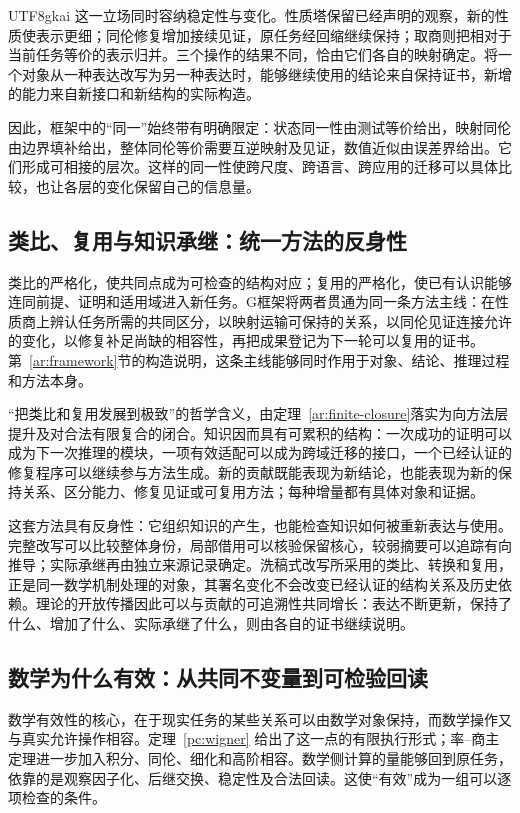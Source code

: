 \documentclass[11pt,a4paper]{article}
\theoremstyle{plain}
\theoremstyle{definition}
\theoremstyle{remark}
\begin{document}
\begin{CJK*}{UTF8}{gkai}
这一立场同时容纳稳定性与变化。性质塔保留已经声明的观察，新的性质使表示更细；同伦修复增加接续见证，原任务经回缩继续保持；取商则把相对于当前任务等价的表示归并。三个操作的结果不同，恰由它们各自的映射确定。将一个对象从一种表达改写为另一种表达时，能够继续使用的结论来自保持证书，新增的能力来自新接口和新结构的实际构造。

因此，框架中的“同一”始终带有明确限定：状态同一性由测试等价给出，映射同伦由边界填补给出，整体同伦等价需要互逆映射及见证，数值近似由误差界给出。它们形成可相接的层次。这样的同一性使跨尺度、跨语言、跨应用的迁移可以具体比较，也让各层的变化保留自己的信息量。

\subsection{类比、复用与知识承继：统一方法的反身性}
\label{ar:philosophy}

类比的严格化，使共同点成为可检查的结构对应；复用的严格化，使已有认识能够连同前提、证明和适用域进入新任务。G框架将两者贯通为同一条方法主线：在性质商上辨认任务所需的共同区分，以映射运输可保持的关系，以同伦见证连接允许的变化，以修复补足尚缺的相容性，再把成果登记为下一轮可以复用的证书。第~\ref{ar:framework}节的构造说明，这条主线能够同时作用于对象、结论、推理过程和方法本身。

“把类比和复用发展到极致”的哲学含义，由定理~\ref{ar:finite-closure}落实为向方法层提升及对合法有限复合的闭合。知识因而具有可累积的结构：一次成功的证明可以成为下一次推理的模块，一项有效适配可以成为跨域迁移的接口，一个已经认证的修复程序可以继续参与方法生成。新的贡献既能表现为新结论，也能表现为新的保持关系、区分能力、修复见证或可复用方法；每种增量都有具体对象和证据。

这套方法具有反身性：它组织知识的产生，也能检查知识如何被重新表达与使用。完整改写可以比较整体身份，局部借用可以核验保留核心，较弱摘要可以追踪有向推导；实际承继再由独立来源记录确定。洗稿式改写所采用的类比、转换和复用，正是同一数学机制处理的对象，其署名变化不会改变已经认证的结构关系及历史依赖。理论的开放传播因此可以与贡献的可追溯性共同增长：表达不断更新，保持了什么、增加了什么、实际承继了什么，则由各自的证书继续说明。\cite{S12,S20,S38}


\subsection{数学为什么有效：从共同不变量到可检验回读}

数学有效性的核心，在于现实任务的某些关系可以由数学对象保持，而数学操作又与真实允许操作相容。定理~\ref{pc:wigner} 给出了这一点的有限执行形式；率--商主定理进一步加入积分、同伦、细化和高阶相容。数学侧计算的量能够回到原任务，依靠的是观察因子化、后继交换、稳定性及合法回读。这使“有效”成为一组可以逐项检查的条件。


\end{CJK*}
\end{document}
